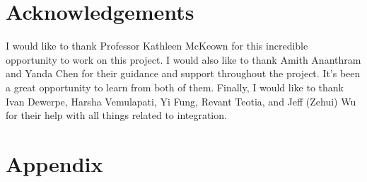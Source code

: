 \documentclass[12pt]{article}
\begin{document}
\section{Acknowledgements}
I would like to thank Professor Kathleen McKeown for this incredible opportunity to work on this project. I would also like to thank Amith Ananthram and Yanda Chen for their guidance and support throughout the project. It's been a great opportunity to learn from both of them. Finally, I would like to thank Ivan Dewerpe, Harsha Vemulapati, Yi Fung, Revant Teotia, and Jeff (Zehui) Wu for their help with all things related to integration.

\printbibliography

\section{Appendix}
\end{document}
